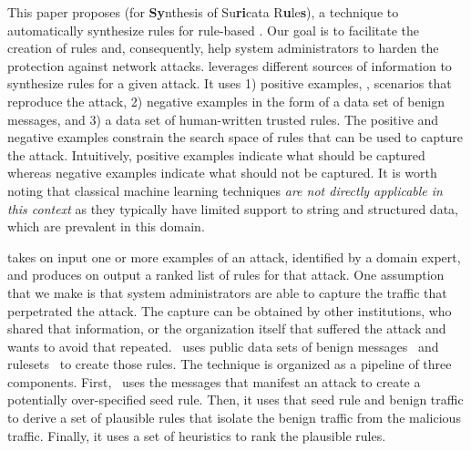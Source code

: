 \documentclass[conference]{IEEEtran}
\begin{document}
\sloppy This paper proposes \tname{} (for \textbf{Sy}nthesis of
Su\textbf{ri}cata R\textbf{u}le\textbf{s}), a technique to
automatically synthesize rules for rule-based \nids. Our goal is to
facilitate the creation of rules and, consequently, help system
administrators to harden the protection against network attacks.
\tname{} leverages different sources of information to synthesize
rules for a given attack. It uses 1) positive examples, \ie{},
scenarios that reproduce the attack, 2) negative examples in the form
of a data set of benign messages, and 3) a data set of human-written
trusted rules. The positive and negative examples constrain the search
space of rules that can be used to capture the attack. Intuitively,
positive examples indicate what should be captured whereas negative
examples indicate what should not be captured. It is worth noting that
classical machine learning techniques \emph{are not directly
  applicable in this context} as they typically have limited support
to string and structured data, which are prevalent in this domain.




\tname{} takes on input one or more examples of an attack, identified by a domain expert, and produces
on output a ranked list of rules for that attack. One assumption that
we make is that system administrators are able to capture the traffic
that perpetrated the attack. The capture can be obtained by other
institutions, who shared that information, or the organization itself
that suffered the attack and wants to avoid that
repeated. \tname\ uses public data sets of benign
messages~\cite{tcpreplay,stratosphere-normal} and
rulesets~\cite{emerging-threats-open} to create those rules. The
technique is organized as a pipeline of three components. First,
\tname\ uses the messages that manifest an attack to create a
potentially over-specified seed rule. Then, it uses that seed rule and
benign traffic to derive a set of plausible rules that isolate the
benign traffic from the malicious traffic. Finally, it uses a set of 
heuristics to rank the plausible rules.
\end{document}
